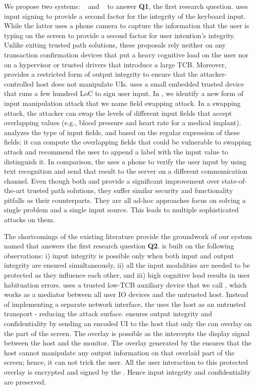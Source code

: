  We propose two systems: \integrikey~\cite{integrikey} and \integriscreen~\cite{integriscreen} to answer \textbf{Q1}, the first research question. \integrikey uses input signing to provide a second factor for the integrity of the keyboard input. While the latter uses a phone camera to capture the information that the user is typing on the screen to provide a second factor for user intention's integrity. Unlike exiting trusted path solutions, these proposals rely neither on any transaction confirmation devices that put a heavy cognitive load on the user nor on a hypervisor or trusted drivers that introduce a large TCB. Moreover, \integriscreen provides a restricted form of output integrity to ensure that the attacker-controlled host does not manipulate UIs. \integrikey uses a small embedded trusted device that runs a few hundred LoC to sign user input. In \integrikey, we identify a new form of input manipulation attack that we name field swapping attack. In a swapping attack, the attacker can swap the levels of different input fields that accept overlapping values (e.g., blood pressure and heart rate for a medical implant). \integrikey analyzes the type of input fields, and based on the regular expression of these fields; it can compute the overlapping fields that could be vulnerable to swapping attack and recommend the user to append a label with the input value to distinguish it. 
In comparison, the \integriscreen uses a phone to verify the user input by using text recognition and send that result to the server on a different communication channel. Even though both \integrikey and \integriscreen provide a significant improvement over state-of-the-art trusted path solutions, they suffer similar security and functionality pitfalls as their counterparts. They are all ad-hoc approaches focus on solving a single problem and a single input source. This leads to multiple sophisticated attacks on them.

The shortcomings of the existing literature provide the groundwork of our system named \protection that answers the first research question \textbf{Q2}.
\protection is built on the following observations: i) input integrity is possible only when both input and output integrity are ensured simultaneously, ii) all the input modalities are needed to be protected as they influence each other, and iii) high cognitive load results in user habituation errors. \protection uses a trusted low-TCB auxiliary device that we call \deviceprotection, which works as a mediator between all user IO devices and the untrusted host. Instead of implementing a separate network interface, the \deviceprotection uses the host as an untrusted transport - reducing the attack surface. \protection ensures output integrity and confidentiality by sending an encoded UI to the host that only the \deviceprotection can overlay on the part of the screen. The overlay is possible as the \deviceprotection intercepts the display signal between the host and the monitor. The overlay generated by the \deviceprotection ensures that the host cannot manipulate any output information on that overlaid part of the screen; hence, it can not trick the user. All the user interaction to this protected overlay is encrypted and signed by the \deviceprotection. Hence input integrity and confidentiality are preserved.

